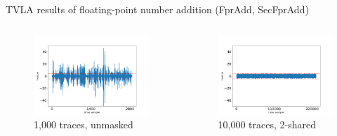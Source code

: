 \begin{frame}{TVLA results of floating-point number addition (FprAdd, SecFprAdd)}

\vskip -15pt
\begin{columns}[T]
\begin{figure}
\includegraphics[width=\textwidth]{figure/tvla-F4-CHES/fpr_add_1k.png}
\vspace{-20pt}
\caption{1,000 traces, unmasked}
\end{figure}

\begin{figure}
\includegraphics[width=\textwidth]{figure/tvla-F4-CHES/SecFprAdd_2shares_10k.png}
\vspace{-20pt}
\caption{10,000 traces, 2-shared}
\end{figure}


\end{columns}
\end{frame}
